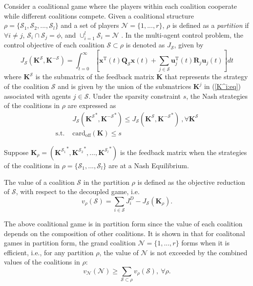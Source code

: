 \documentclass[12pt, draftclsnofoot,onecolumn]{IEEEtran}
\begin{document}
Consider a coalitional game where the players within each coalition cooperate while different coalitions compete. Given a coalitional structure $\rho = \{\mathcal S_1, \mathcal S_2, ..., \mathcal S_l\}$ and a set of players $\mathcal N=\{1,...,r\}$, $\rho$ is defined as a {\it partition} if $\forall i\neq j$, $\mathcal S_i \cap \mathcal S_j= \phi$, and $\cup_{i=1}^{l}\mathcal S_i=\mathcal N$ . In the multi-agent control problem, the control objective of each coalition $\mathcal S \subset \rho$ is denoted as $J_{\mathcal S}$, given by
\begin{equation}
\label{Jsi:eq}
J_{\mathcal S}(\boldsymbol K^{\mathcal S},\boldsymbol K^{-\mathcal S}) = \int_{t=0}^{\infty}{[\boldsymbol x^{\mathrm{T}}(t)\boldsymbol Q_{\mathcal S}\boldsymbol x(t) + \sum_{j\in\mathcal S}\boldsymbol u_j^{\mathrm{T}}(t)\boldsymbol R_j\boldsymbol u_j(t)]dt}
\end{equation}
\noindent where $\boldsymbol K^{\mathcal S}$ is the submatrix of the feedback matrix $\boldsymbol K$ that represents the strategy of the coalition $\mathcal S$ and is given by the union of the submatrices $\boldsymbol K^j$ in (\ref{K^i:eq}) associated with agents $j\in \mathcal S$. Under the sparsity constraint $s$, the Nash strategies of the coalitions in $\rho$ are expressed as 
\begin{align}
&J_{\mathcal S}({{\boldsymbol K}^{\mathcal S}}^*,{{\boldsymbol K}^{-\mathcal S}}^*) \leq J_{\mathcal S}({\boldsymbol K}^{\mathcal S},{{\boldsymbol K}^{-\mathcal S}}^*) ~,\forall {\boldsymbol K}^{\mathcal S}\nonumber\\
\mbox{s.t. } & \mathrm{card}_{\mathrm{off}}({\boldsymbol K}) \leq s 
\label{NE_coal:eq}
\end{align}

\noindent Suppose $\boldsymbol K_{\rho} = ({\boldsymbol K^{\mathcal S_1}}^*, {\boldsymbol K^{\mathcal S_2}}^*,...,{\boldsymbol K^{\mathcal S_l}}^*)$ is the feedback matrix when the strategies of the coalitions in $\rho = \{\mathcal S_1,...,\mathcal S_l\}$ are at a Nash Equilibrium.

The value of a coalition $\mathcal S$ in the partition $\rho$ is defined as the objective reduction of $\mathcal S$, with respect to the decoupled game, i.e.
\begin{equation}
v_{\rho}(\mathcal S) = \sum_{i\in \mathcal S}{J_i^{D}} - J_{\mathcal S}(\boldsymbol K_{\rho}).
\label{v_S:eq}
\end{equation}

\noindent The above coalitional game is in partition form \cite{Hafalir2007242} since the value of each coalition depends on the composition of other coalitions. It is shown in \cite{Hafalir2007242} that for coalitonal games in partition form, the grand coalition $\mathcal N=\{1,...,r\}$ forms when it is efficient, i.e., for any partition $\rho$, the value of $\mathcal N$ is not exceeded by the combined values of the coalitions in $\rho$:
\begin{equation}
v_{\mathcal N}(\mathcal N) \geq \sum_{\mathcal S \subset \rho}v_{\rho}(\mathcal S),~\forall \rho.
\label{eff:eq}
\end{equation}
\end{document}
